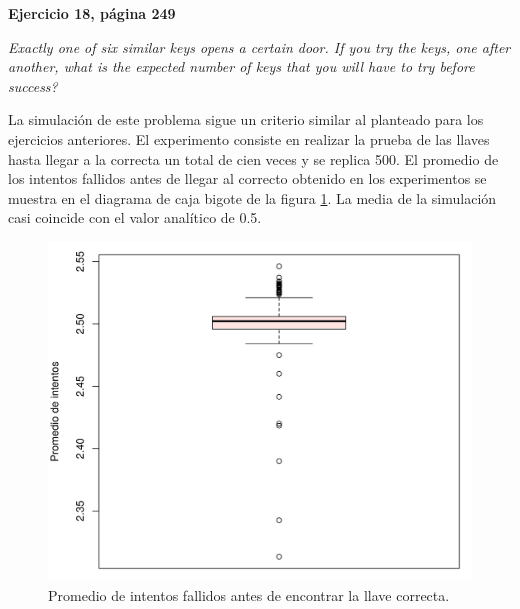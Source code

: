 \documentclass[12pt]{article}
\begin{document}
	{\bf Ejercicio 18, página 249}
	
	{\em Exactly one of six similar keys opens a certain door. If you try the keys, one after another, what is the expected number of keys that you will have to try before success?}
	
	La simulación de este problema sigue un criterio similar al planteado para los ejercicios anteriores. El experimento consiste en realizar la prueba de las llaves hasta llegar a la correcta un total de cien veces y se replica 500. El promedio de los intentos fallidos antes de llegar al correcto obtenido en los experimentos se muestra en el diagrama de caja bigote de la figura \ref{keys}. La media de la simulación casi coincide con el valor analítico de 0.5.
	
	\begin{figure}
		\centering
		\includegraphics[scale=0.5]{llaves.png}
		\caption{Promedio de intentos fallidos antes de encontrar la llave correcta.}
		\label{keys}
	\end{figure}

%	
	
%	
	
	
	
	


\end{document}
